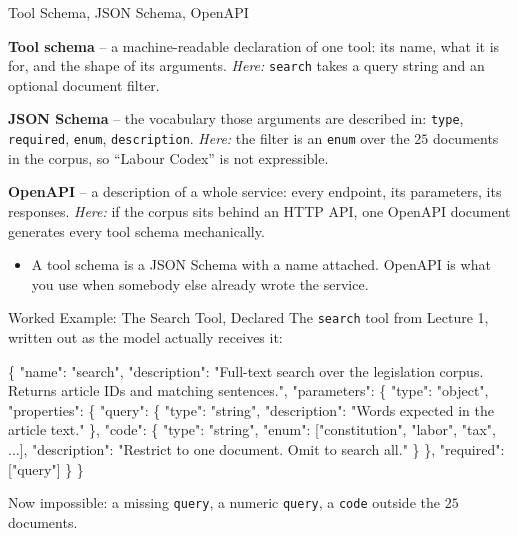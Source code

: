 \begin{frame}{Tool Schema, JSON Schema, OpenAPI}
\begin{rldefinition}
\textbf{Tool schema} -- a machine-readable declaration of one tool: its name, what it is for, and the shape of its arguments. \emph{Here:} \texttt{search} takes a query string and an optional document filter.

\smallskip
\textbf{JSON Schema} -- the vocabulary those arguments are described in: \texttt{type}, \texttt{required}, \texttt{enum}, \texttt{description}. \emph{Here:} the filter is an \texttt{enum} over the $25$ documents in the corpus, so ``Labour Codex'' is not expressible.

\smallskip
\textbf{OpenAPI} -- a description of a whole service: every endpoint, its parameters, its responses. \emph{Here:} if the corpus sits behind an HTTP API, one OpenAPI document generates every tool schema mechanically.
\end{rldefinition}
\pause
\begin{itemize}
  \item A tool schema is a JSON Schema with a name attached. OpenAPI is what you use when somebody else already wrote the service.
\end{itemize}
\end{frame}

\begin{frame}[fragile]{Worked Example: The Search Tool, Declared}
\footnotesize
The \texttt{search} tool from Lecture 1, written out as the model actually receives it:
\vspace{0.3em}

\scriptsize
\begin{semiverbatim}
\{ "name": "search",
  "description": "Full-text search over the legislation corpus.
                  Returns article IDs and matching sentences.",
  "parameters": \{
    "type": "object",
    "properties": \{
      "query": \{ "type": "string",
                 "description": "Words expected in the article text." \},
      "code":  \{ "type": "string",
                 "enum": ["constitution", "labor", "tax", ...],
                 "description": "Restrict to one document. Omit to search all." \}
    \},
    "required": ["query"]
  \} \}
\end{semiverbatim}
\pause
\footnotesize Now impossible: a missing \texttt{query}, a numeric \texttt{query}, a \texttt{code} outside the $25$ documents.
\end{frame}

